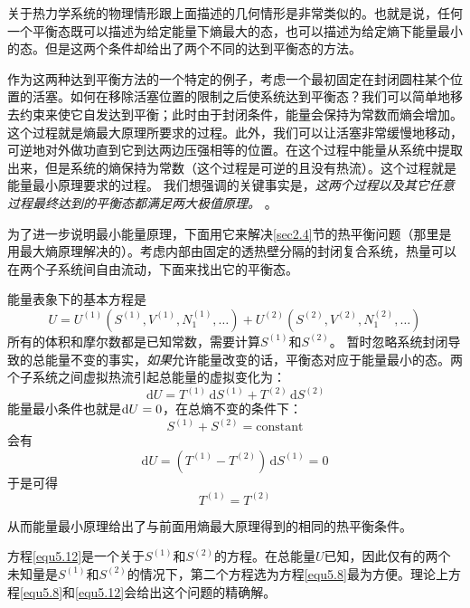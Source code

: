 关于热力学系统的物理情形跟上面描述的几何情形是非常类似的。也就是说，任何一个平衡态既可以描述为给定能量下熵最大的态，也可以描述为给定熵下能量最小的态。但是这两个条件却给出了两个不同的达到平衡态的方法。

作为这两种达到平衡方法的一个特定的例子，考虑一个最初固定在封闭圆柱某个位置的活塞。如何在移除活塞位置的限制之后使系统达到平衡态？我们可以简单地移去约束来使它自发达到平衡；此时由于封闭条件，能量会保持为常数而熵会增加。这个过程就是熵最大原理所要求的过程。此外，我们可以让活塞非常缓慢地移动，可逆地对外做功直到它到达两边压强相等的位置。在这个过程中能量从系统中提取出来，但是系统的熵保持为常数（这个过程是可逆的且没有热流）。这个过程就是能量最小原理要求的过程。
我们想强调的关键事实是，{\it 这两个过程以及其它任意过程最终达到的平衡态都满足两大极值原理。}%
%
。

为了进一步说明最小能量原理，下面用它来解决\ref{sec2.4}节的热平衡问题（那里是用最大熵原理解决的）。考虑内部由固定的透热壁分隔的封闭复合系统，热量可以在两个子系统间自由流动，下面来找出它的平衡态。

能量表象下的基本方程是
\begin{equation}
\label{equ5.8}
U=U^{(1)}(S^{(1)},V^{(1)},N^{(1)}_1,\ldots)+U^{(2)}(S^{(2)},V^{(2)},N^{(2)}_1,\ldots)
\end{equation}
所有的体积和摩尔数都是已知常数，需要计算$S^{(1)}$和$S^{(2)}$。
暂时忽略系统封闭导致的总能量不变的事实，{\it 如果}允许能量改变的话，平衡态对应于能量最小的态。两个子系统之间虚拟热流引起总能量的虚拟变化为：
\begin{equation}
\label{equ5.9}
\,\mathrm dU=T^{(1)}\,\mathrm dS^{(1)}+T^{(2)}\,\mathrm dS^{(2)}
\end{equation}
能量最小条件也就是$\mathrm{d} U = 0$，在总熵不变的条件下：
\begin{equation}
\label{equ5.10}
S^{(1)}+S^{(2)}=\text{constant}
\end{equation}
会有
\begin{equation}
\label{equ5.11}
\mathrm dU=(T^{(1)}-T^{(2)})\,\mathrm dS^{(1)}=0
\end{equation}
于是可得
\begin{equation}
\label{equ5.12}
T^{(1)}=T^{(2)}
\end{equation}

从而能量最小原理给出了与前面用熵最大原理得到的相同的热平衡条件。

方程\eqref{equ5.12}是一个关于$S^{(1)}$和$S^{(2)}$的方程。在总能量$U$已知，因此仅有的两个未知量是$S^{(1)}$和$S^{(2)}$的情况下，第二个方程选为方程\eqref{equ5.8}最为方便。理论上方程\eqref{equ5.8}和\eqref{equ5.12}会给出这个问题的精确解。

